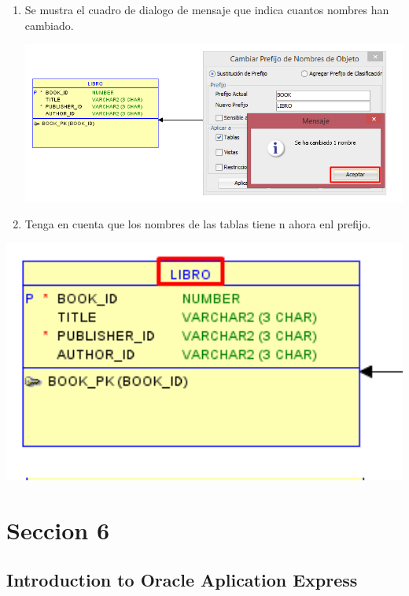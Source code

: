 \documentclass[12pt,letterpaper]{article}
\begin{document}
\begin{enumerate}[1.]
    \item Se mustra el cuadro de dialogo de mensaje que indica cuantos nombres han cambiado.  
    
    \includegraphics[width=15cm]{./giselaImagen/imagen11.png} 
    
    \item Tenga en cuenta que los nombres de las tablas tiene n ahora enl prefijo.  
		\end{enumerate}
		
		\includegraphics[width=15cm]{./giselaImagen/imagen12.png} 













 \newpage
 
\section{Seccion 6 } 
\subsection{Introduction to Oracle Aplication Express}
\end{document}
